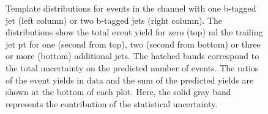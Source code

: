\begin{figure}[htbp!]
\begin{center}
\caption{Template distributions for events in the \ee channel with one b-tagged jet (left column) or two b-tagged jets (right column). The distributions show the total event yield for zero (top) nd the trailing jet pt for one (second from top),
  two (second from bottom) or three or more (bottom) additional jets. 
  The hatched bands correspond to the total uncertainty on the predicted number of events. The ratios of the event yields in data and the sum of the
  predicted yields are shown at the bottom of each plot. Here, the solid
  gray band represents the contribution of the statistical uncertainty.  
       \label{fig:xsec_ee_inputdistr}}
  \end{center}
\end{figure}


